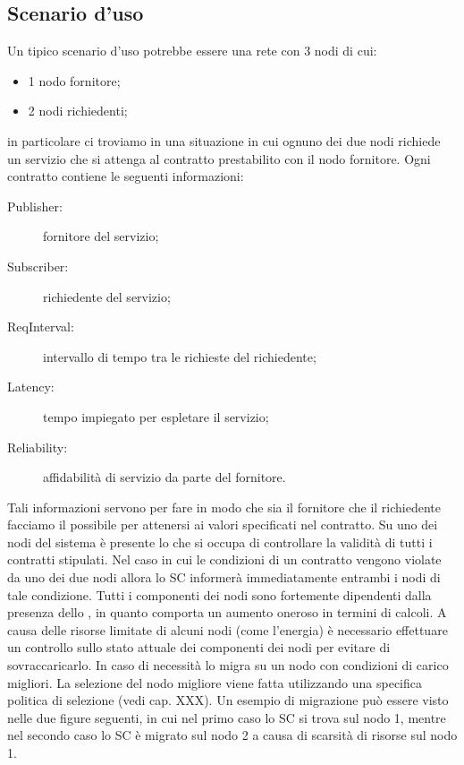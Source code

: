\subsection{Scenario d'uso}
Un tipico scenario d'uso potrebbe essere una rete con 3 nodi di cui:
\begin{itemize}
\item 1 nodo fornitore;
\item 2 nodi richiedenti;
\end{itemize}
in particolare ci troviamo in una situazione in cui ognuno dei due nodi richiede un servizio che si attenga al contratto prestabilito con il nodo fornitore. Ogni contratto contiene le seguenti informazioni:
\begin{description}
\item[Publisher:] fornitore del servizio;
\item[Subscriber:] richiedente del servizio;
\item[ReqInterval:] intervallo di tempo tra le richieste del richiedente;
\item[Latency:] tempo impiegato per espletare il servizio;
\item[Reliability:] affidabilità di servizio da parte del fornitore.
\end{description}
Tali informazioni servono per fare in modo che sia il fornitore che il richiedente facciamo il possibile per attenersi ai valori specificati nel contratto.
Su uno dei nodi del sistema è presente lo  che si occupa di controllare la validità di tutti i contratti stipulati. Nel caso in cui le condizioni di un contratto vengono violate da uno dei due nodi allora lo SC informerà immediatamente entrambi i nodi di tale condizione. Tutti i componenti dei nodi sono fortemente dipendenti dalla presenza dello , in quanto comporta un aumento oneroso in termini di calcoli. A causa delle risorse limitate di alcuni nodi (come l'energia) è necessario effettuare un controllo sullo stato attuale dei componenti dei nodi per evitare di sovraccaricarlo. In caso di necessità lo  migra su un nodo con condizioni di carico migliori. La selezione del nodo migliore viene fatta utilizzando una specifica politica di selezione (vedi cap. XXX). Un esempio di migrazione può essere visto nelle due figure seguenti, in cui nel primo caso lo SC si trova sul nodo 1, mentre nel secondo caso lo SC è migrato sul nodo 2 a causa di scarsità di risorse sul nodo 1.
